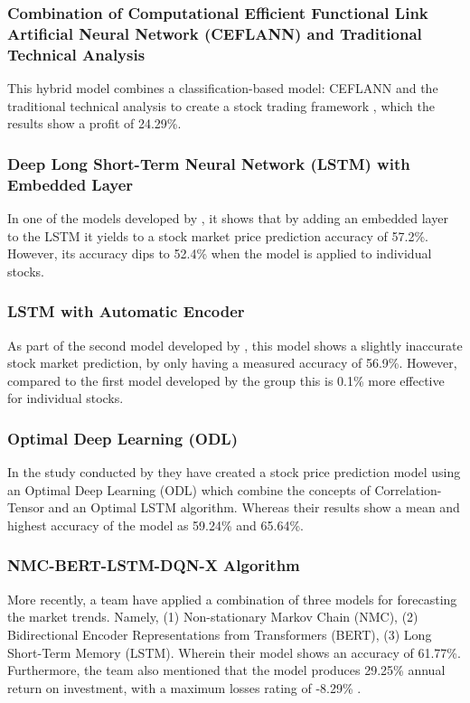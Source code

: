 \subsubsection{Combination of Computational Efficient Functional Link Artificial Neural Network (CEFLANN) and Traditional Technical Analysis}
\label{subsubsec:ceflann}
This hybrid model combines a classification-based model: CEFLANN and 
the traditional technical analysis to create a stock trading framework 
, which the results show a profit of 24.29\%.
\subsubsection{Deep Long Short-Term Neural Network (LSTM) with Embedded Layer}
\label{subsubsec:lstm}
In one of the models developed by , 
it shows that by adding an embedded layer to the LSTM it yields to a 
stock market price prediction accuracy of 57.2\%. 
However, its accuracy dips to 52.4\% when the model is applied to individual stocks.
\subsubsection{LSTM with Automatic Encoder}
\label{subsubsec:lstm_autoencoder}
As part of the second model developed by , this model 
shows a slightly inaccurate stock market prediction, by only having 
a measured accuracy of 56.9\%. 
However, compared to the first model developed by the group this is 0.1\%
more effective for individual stocks.
\subsubsection{Optimal Deep Learning (ODL)}
\label{subsubsec:odl}
In the study conducted by  they have created a 
stock price prediction model using an Optimal Deep Learning (ODL) 
which combine the concepts of Correlation-Tensor and an Optimal LSTM algorithm. 
Whereas their results show a mean and highest accuracy of the model as 59.24\% 
and 65.64\%.
\subsubsection{NMC-BERT-LSTM-DQN-X Algorithm}
\label{subsubsec:nmc_bert_lstm_dqn_x}
More recently, a team have applied a combination of three models for 
forecasting the market trends. Namely, (1) Non-stationary Markov Chain (NMC), 
(2) Bidirectional Encoder Representations from Transformers (BERT), 
(3) Long Short-Term Memory (LSTM). Wherein their model shows an accuracy of 61.77\%. 
Furthermore, the team also mentioned that the model produces 29.25\% 
annual return on investment, with a maximum losses rating of -8.29\% 
\cite{Liu2022}.

